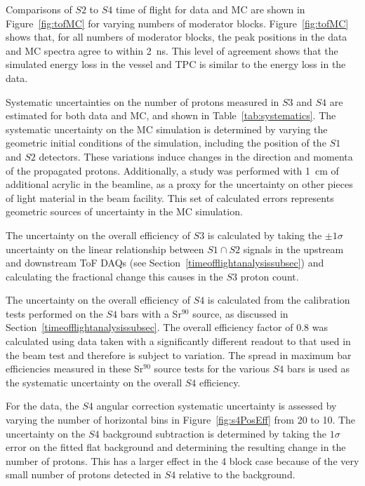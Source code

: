 Comparisons of $\mathit{S2}$ to $\mathit{S4}$ time of flight for data and MC are shown in Figure~\ref{fig:tofMC} for varying numbers of moderator blocks.
Figure~\ref{fig:tofMC} shows that, for all numbers of moderator blocks, the peak positions in the data and MC spectra agree to within 2~ns.
This level of agreement shows that the simulated energy loss in the vessel and TPC is similar to the energy loss in the data.
  
Systematic uncertainties on the number of protons measured in $\mathit{S3}$ and $\mathit{S4}$ are estimated for both data and MC, and shown in Table~\ref{tab:systematics}.
The systematic uncertainty on the MC simulation is determined by varying the geometric initial conditions of the simulation, including the position of the $\mathit{S1}$ and $\mathit{S2}$ detectors.
These variations induce changes in the direction and momenta of the propagated protons.
Additionally, a study was performed with 1~cm of additional acrylic in the beamline, as a proxy for the uncertainty on other pieces of light material in the beam facility.
This set of calculated errors represents geometric sources of uncertainty in the MC simulation.

The uncertainty on the overall efficiency of $\mathit{S3}$ is calculated by taking the $\pm1\sigma$ uncertainty on the linear relationship between $\mathit{S1} \cap \mathit{S2}$ signals in the upstream and downstream ToF DAQs (see Section~\ref{timeofflightanalysissubsec}) and calculating the fractional change this causes in the $\mathit{S3}$ proton count.

The uncertainty on the overall efficiency of $\mathit{S4}$ is calculated from the calibration tests performed on the $\mathit{S4}$ bars with a Sr$^{90}$ source, as discussed in Section~\ref{timeofflightanalysissubsec}.
The overall efficiency factor of 0.8 was calculated using data taken with a significantly different readout to that used in the beam test and therefore is subject to variation. 
The spread in maximum bar efficiencies measured in these Sr$^{90}$ source tests for the various $\mathit{S4}$ bars is used as the systematic uncertainty on the overall $\mathit{S4}$ efficiency.

For the data, the $\mathit{S4}$ angular correction systematic uncertainty is assessed by varying the number of horizontal bins in Figure~\ref{fig:s4PosEff} from 20 to 10.
The uncertainty on the $\mathit{S4}$ background subtraction is determined by taking the $1\sigma$ error on the fitted flat background and determining the resulting change in the number of protons.
This has a larger effect in the 4 block case because of the very small number of protons detected in $\mathit{S4}$ relative to the background.


